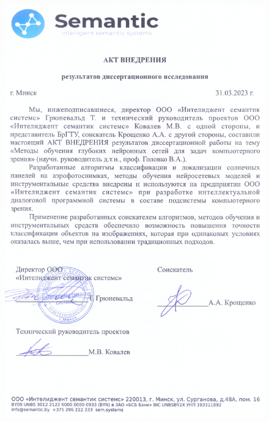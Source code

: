 \begin{figure}[ht]
	\centering
	\includegraphics[width=17cm]{man-source/images/appendix/appendixActs/actISS-2.jpg}
\end{figure}


